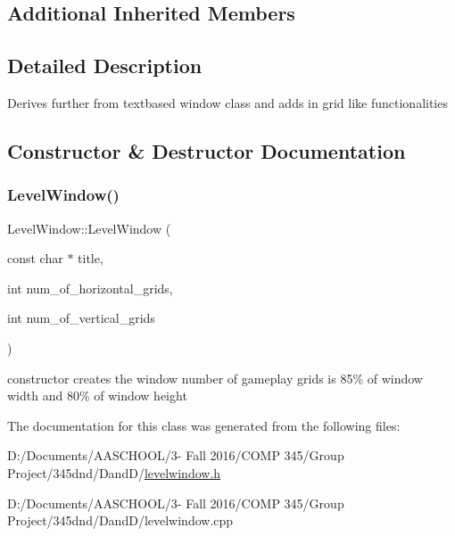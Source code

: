 \subsection*{Additional Inherited Members}


\subsection{Detailed Description}
Derives further from textbased window class and adds in grid like functionalities 

\subsection{Constructor \& Destructor Documentation}
\hypertarget{class_level_window_a2a9cf49d7e82deb24c7f80eb6cae11a8}{}\label{class_level_window_a2a9cf49d7e82deb24c7f80eb6cae11a8} 
\subsubsection{\texorpdfstring{Level\+Window()}{LevelWindow()}}
{\footnotesize\ttfamily Level\+Window\+::\+Level\+Window (\begin{DoxyParamCaption}\item[{const char $\ast$}]{title,  }\item[{int}]{num\+\_\+of\+\_\+horizontal\+\_\+grids,  }\item[{int}]{num\+\_\+of\+\_\+vertical\+\_\+grids }\end{DoxyParamCaption})}

constructor creates the window number of gameplay grids is 85\% of window width and 80\% of window height 

The documentation for this class was generated from the following files\+:\begin{DoxyCompactItemize}
\item 
D\+:/\+Documents/\+A\+A\+S\+C\+H\+O\+O\+L/3-\/ Fall 2016/\+C\+O\+M\+P 345/\+Group Project/345dnd/\+Dand\+D/\hyperlink{levelwindow_8h}{levelwindow.\+h}\item 
D\+:/\+Documents/\+A\+A\+S\+C\+H\+O\+O\+L/3-\/ Fall 2016/\+C\+O\+M\+P 345/\+Group Project/345dnd/\+Dand\+D/levelwindow.\+cpp\end{DoxyCompactItemize}
